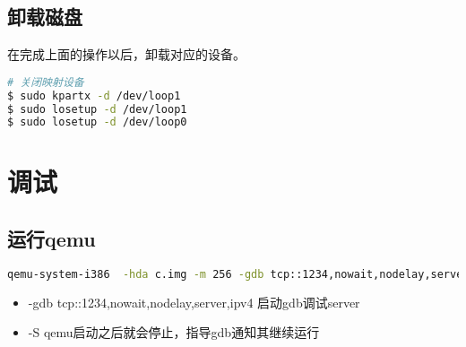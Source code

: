 \documentclass[b5paper,9pt,twoside,openany]{article}
\begin{document}
\subsection{卸载磁盘}
在完成上面的操作以后，卸载对应的设备。
\begin{lstlisting}[language=bash]
# 关闭映射设备
$ sudo kpartx -d /dev/loop1
$ sudo losetup -d /dev/loop1
$ sudo losetup -d /dev/loop0
\end{lstlisting}

\section{调试}
\subsection{运行qemu}
\begin{lstlisting}[language=bash]
qemu-system-i386  -hda c.img -m 256 -gdb tcp::1234,nowait,nodelay,server,ipv4 -S
\end{lstlisting}
\begin{itemize}
\item -gdb tcp::1234,nowait,nodelay,server,ipv4 启动gdb调试server
\item -S qemu启动之后就会停止，指导gdb通知其继续运行
\end{itemize}
\end{document}
